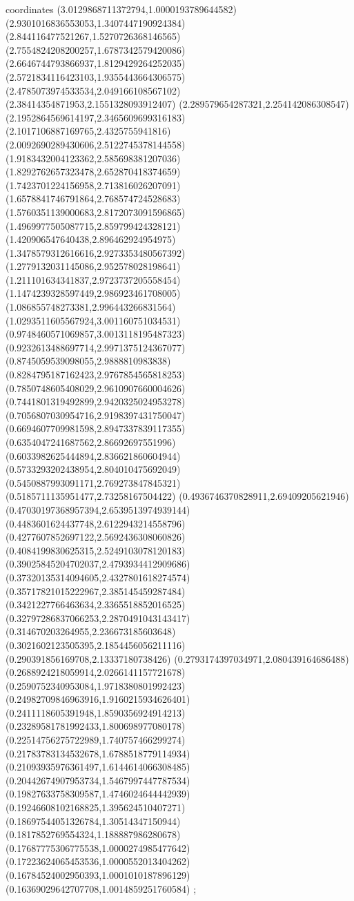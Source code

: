 coordinates {%
(3.0129868711372794,1.0000193789644582)
(2.9301016836553053,1.3407447190924384)
(2.844116477521267,1.5270726368146565)
(2.7554824208200257,1.6787342579420086)
(2.6646744793866937,1.8129429264252035)
(2.5721834116423103,1.9355443664306575)
(2.4785073974533534,2.049166108567102)
(2.38414354871953,2.1551328093912407)
(2.289579654287321,2.254142086308547)
(2.1952864569614197,2.3465609699316183)
(2.1017106887169765,2.4325755941816)
(2.0092690289430606,2.5122745378144558)
(1.9183432004123362,2.585698381207036)
(1.8292762657323478,2.652870418374659)
(1.7423701224156958,2.713816026207091)
(1.6578841746791864,2.768574724528683)
(1.5760351139000683,2.8172073091596865)
(1.4969977505087715,2.859799424328121)
(1.420906547640438,2.896462924954975)
(1.3478579312616616,2.9273353480567392)
(1.2779132031145086,2.952578028198641)
(1.211101634341837,2.9723737205558454)
(1.1474239328597449,2.986923461708005)
(1.086855748273381,2.996443266831564)
(1.0293511605567924,3.001160751034531)
(0.9748460571069857,3.0013118195487323)
(0.9232613488697714,2.9971375124367077)
(0.8745059539098055,2.9888810983838)
(0.8284795187162423,2.9767854565818253)
(0.7850748605408029,2.9610907660004626)
(0.7441801319492899,2.9420325024953278)
(0.7056807030954716,2.9198397431750047)
(0.6694607709981598,2.8947337839117355)
(0.6354047241687562,2.86692697551996)
(0.6033982625444894,2.836621860604944)
(0.5733293202438954,2.804010475692049)
(0.5450887993091171,2.769273847845321)
(0.5185711135951477,2.73258167504422)
(0.4936746370828911,2.69409205621946)
(0.47030197368957394,2.6539513974939144)
(0.4483601624437748,2.6122943214558796)
(0.4277607852697122,2.5692436308060826)
(0.4084199830625315,2.5249103078120183)
(0.39025845204702037,2.4793934412909686)
(0.37320135314094605,2.4327801618274574)
(0.35717821015222967,2.385145459287484)
(0.3421227766463634,2.3365518852016525)
(0.32797286837066253,2.2870491043143417)
(0.314670203264955,2.236673185603648)
(0.3021602123505395,2.1854456056211116)
(0.290391856169708,2.13337180738426)
(0.2793174397034971,2.080439164686488)
(0.2688924218059914,2.0266141157721678)
(0.2590752340953084,1.9718380801992423)
(0.24982709846963916,1.9160215934626401)
(0.2411118605391948,1.8590356924914213)
(0.23289581781992433,1.800698977080178)
(0.22514756275722989,1.740757466299274)
(0.21783783134532678,1.6788518779114934)
(0.21093935976361497,1.6144614066308485)
(0.20442674907953734,1.5467997447787534)
(0.19827633758309587,1.4746024644442939)
(0.19246608102168825,1.395624510407271)
(0.18697544051326784,1.30514347150944)
(0.1817852769554324,1.188887986280678)
(0.17687775306775538,1.0000274985477642)
(0.17223624065453536,1.0000552013404262)
(0.16784524002950393,1.0001010187896129)
(0.16369029642707708,1.0014859251760584)
};
